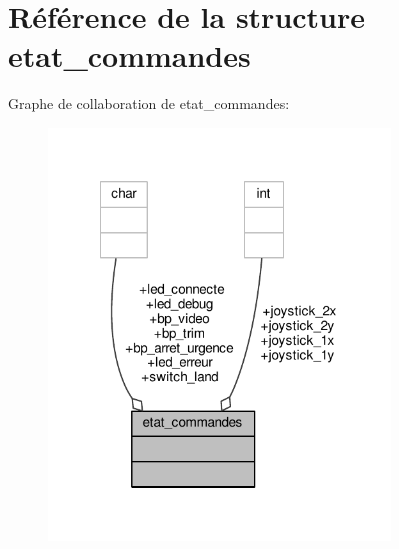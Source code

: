 \hypertarget{structetat__commandes}{\section{Référence de la structure etat\-\_\-commandes}
\label{structetat__commandes}
}


Graphe de collaboration de etat\-\_\-commandes\-:\nopagebreak
\begin{figure}[H]
\begin{center}
\leavevmode
\includegraphics[width=257pt]{structetat__commandes__coll__graph}
\end{center}
\end{figure}
